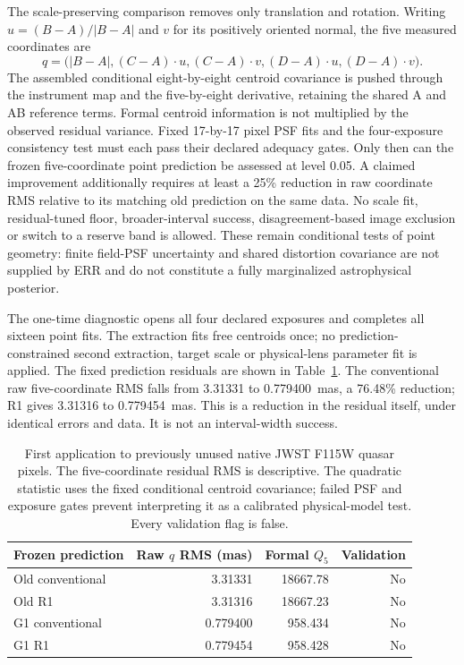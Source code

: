 The scale-preserving comparison removes only translation and rotation.
Writing $u=(B-A)/|B-A|$ and $v$ for its positively oriented normal,
the five measured coordinates are
\begin{equation}
 q=\bigl(|B-A|,(C-A)\!\cdot u,(C-A)\!\cdot v,
                  (D-A)\!\cdot u,(D-A)\!\cdot v\bigr).
 \label{eq:he0435-intrinsic-five-geometry}
\end{equation}
The assembled conditional eight-by-eight centroid covariance is pushed through the instrument map and
the five-by-eight derivative, retaining the shared A and AB reference
terms. Formal centroid information is not multiplied by the observed
residual variance. Fixed 17-by-17 pixel PSF fits and the four-exposure
consistency test must each pass their declared adequacy gates. Only
then can the frozen five-coordinate point prediction be assessed at
level 0.05. A claimed improvement additionally requires at least a
25\% reduction in raw coordinate RMS relative to its matching old
prediction on the same data. No scale fit, residual-tuned floor,
broader-interval success, disagreement-based image exclusion or switch
to a reserve band is allowed. These remain conditional tests of point
geometry: finite field-PSF uncertainty and shared distortion covariance
are not supplied by ERR and do not constitute a fully marginalized
astrophysical posterior.

The one-time diagnostic opens all four declared exposures and completes
all sixteen point fits. The extraction fits free centroids once; no prediction-constrained
second extraction, target scale or physical-lens parameter fit is applied. The fixed prediction residuals are shown
in Table~\ref{tab:he0435-jwst-diagnostic}. The conventional raw five-coordinate
RMS falls from 3.31331 to 0.779400~mas, a 76.48\% reduction; R1 gives
3.31316 to 0.779454~mas. This is a reduction in the residual itself,
under identical errors and data. It is not an interval-width success.

\begin{table}[htbp]
\centering
\caption{First application to previously unused native JWST F115W
quasar pixels. The five-coordinate residual RMS is descriptive. The
quadratic statistic uses the fixed conditional centroid covariance;
failed PSF and exposure gates prevent interpreting it as a calibrated
physical-model test. Every validation flag is false.}
\label{tab:he0435-jwst-diagnostic}
\begin{tabular}{lrrr}
\toprule
Frozen prediction & Raw $q$ RMS (mas) & Formal $Q_5$ & Validation\\
\midrule
Old conventional & 3.31331 & 18667.78 & No\\
Old R1 & 3.31316 & 18667.23 & No\\
G1 conventional & 0.779400 & 958.434 & No\\
G1 R1 & 0.779454 & 958.428 & No\\
\bottomrule
\end{tabular}
\end{table}

